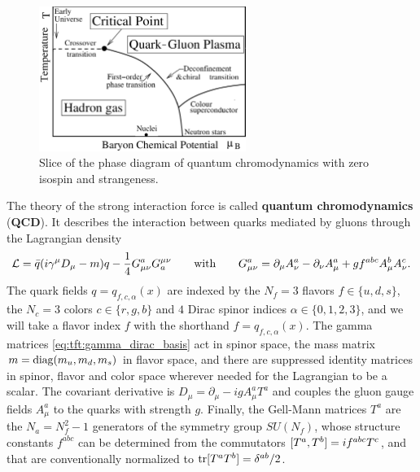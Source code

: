 \begin{figure}[t]
\centering
\includegraphics[width=0.6\textwidth]{figures/qcd-phase-diagram.png}
\caption{%
	Slice of the phase diagram of quantum chromodynamics with zero isospin and strangeness.
}
\label{fig:qcd:phase_diagram}
\end{figure}

The theory of the strong interaction force is called \textbf{quantum chromodynamics} (\textbf{QCD}).
It describes the interaction between quarks mediated by gluons through the Lagrangian density
\begin{equation}
	\mathcal{L} = \bar{q} ( i \gamma^\mu D_\mu - m ) q - \frac14 G_{\mu\nu}^a G^{\mu\nu}_a
	\qquad \text{with} \qquad
	G_{\mu\nu}^a = \partial_\mu A_\nu^a - \partial_\nu A_\mu^a + g f^{abc} A_\mu^b A_\nu^c.
\label{eq:qcd:lagrangian}
\end{equation}
The quark fields $q = q_{f,c,\alpha}(x)$ are indexed by
the $N_f = 3$ flavors $f \in \{u,d,s\}$,
the $N_c = 3$ colors $c \in \{r,g,b\}$ and
$4$ Dirac spinor indices $\alpha \in \{0,1,2,3\}$,
and we will take a flavor index $f$ with the shorthand $f = q_{f,c,\alpha}(x)$.
The gamma matrices \eqref{eq:tft:gamma_dirac_basis} act in spinor space,
the mass matrix $m = \operatorname{diag}(m_u, m_d, m_s)$ in flavor space,
and there are suppressed identity matrices in spinor, flavor and color space wherever needed for the Lagrangian to be a scalar.
The covariant derivative is $D_\mu = \partial_\mu - i g A_\mu^a T^a$ and couples the gluon gauge fields $A_\mu^a$ to the quarks with strength $g$.
Finally, the Gell-Mann matrices $T^a$ are the $N_a = N_f^2 - 1$ generators of the symmetry group $SU(N_f)$,
whose structure constants $f^{abc}$ can be determined from the commutators $[ T^a , T^b ] = i f^{abc} T^c$,
and that are conventionally normalized to $\operatorname{tr}[T^a T^b] = \delta^{ab}/2$.

